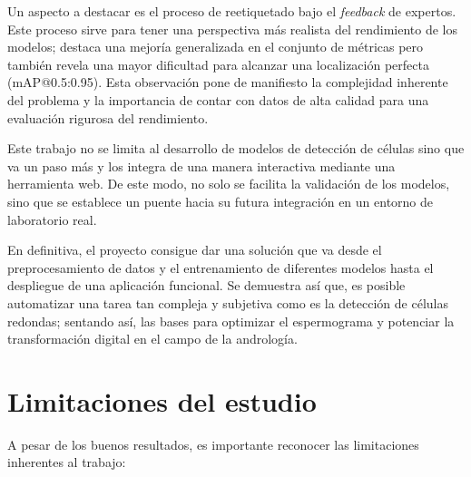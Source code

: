 \documentclass[12pt,a4paper,onecolumn,oneside]{report}
\begin{document}
Un aspecto a destacar es el proceso de reetiquetado bajo el \textit{feedback} de expertos. Este proceso sirve para tener una perspectiva más realista del rendimiento de los modelos; destaca una mejoría 
generalizada en el conjunto de métricas pero también revela una mayor dificultad para alcanzar una localización perfecta (mAP@0.5:0.95). Esta observación pone de manifiesto la complejidad inherente 
del problema y la importancia de contar con datos de alta calidad para una evaluación rigurosa del rendimiento.

Este trabajo no se limita al desarrollo de modelos de detección de células sino que va un paso más y los integra de una manera interactiva mediante una herramienta web. 
De este modo, no solo se facilita la validación de los modelos, sino que se establece un puente hacia su futura integración en un entorno de laboratorio real.

En definitiva, el proyecto consigue dar una solución que va desde el preprocesamiento de datos y el entrenamiento de diferentes modelos hasta el despliegue de una aplicación funcional. Se demuestra así que, es posible automatizar 
una tarea tan compleja y subjetiva como es la detección de células redondas; sentando así, las bases para optimizar el espermograma y potenciar la transformación digital en el campo de la andrología.

\section{Limitaciones del estudio}
\label{sec:Limitaciones del estudio}

A pesar de los buenos resultados, es importante reconocer las limitaciones inherentes al trabajo:
\end{document}
